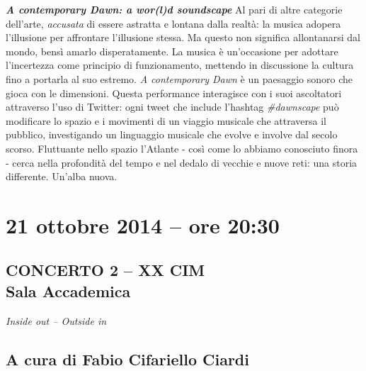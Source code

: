 \documentclass[9pt, twoside, a5paper]{extreport}
\newcommand{\descrizione}[2]{%
\noindent \textbf{\textit{#1}} %
#2 %
\\
}%
\begin{document}
\begin{multicols}{2}
\descrizione{A contemporary Dawn: a wor(l)d soundscape}{Al pari di altre categorie dell'arte, \textit{accusata} di essere astratta e lontana dalla realtà: la musica adopera l'illusione per affrontare l'illusione stessa. Ma questo non significa allontanarsi dal mondo, bensì amarlo disperatamente. La musica è un'occasione per adottare l'incertezza come principio di funzionamento, mettendo in discussione la cultura fino a portarla al suo estremo.
\textit{A contemporary Dawn} è un paesaggio sonoro che gioca con le dimensioni. Questa performance interagisce con i suoi ascoltatori attraverso l’uso di Twitter: ogni tweet che include l’hashtag \textit{\#dawnscape} può modificare lo spazio e i movimenti di un viaggio musicale che attraversa il pubblico, investigando un linguaggio musicale che evolve e involve dal secolo scorso.
Fluttuante nello spazio l'Atlante - così come lo abbiamo conosciuto finora - cerca nella profondità del tempo e nel dedalo di vecchie e nuove reti: una storia differente. Un’alba nuova.}

\end{multicols}

\clearpage



\section*{21 ottobre 2014 -- ore 20:30}
\subsection*{{\small CONCERTO 2 -- XX CIM\\}\textsf{Sala Accademica\\}}

{\fontsize{30}{30}\selectfont \textit{Inside out -- Outside in}}

\subsection*{\textsf{A cura di Fabio Cifariello Ciardi}}
\end{document}
